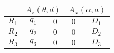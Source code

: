 \begin{tabular}{c|c|c|c|c|}
            \cline{2-5} &
            \multicolumn{2}{|c|}{$A_z(\theta,d)$} &
            \multicolumn{2}{|c|}{$A_x(\alpha,a)$} \\
            \hline
        \multicolumn{1}{|c|}{$R_1$} & $q_{1}$ & $0$ & $0$ & $D_{1}$ \\
            \hline
        \multicolumn{1}{|c|}{$R_2$} & $q_{2}$ & $0$ & $0$ & $D_{2}$ \\
            \hline
        \multicolumn{1}{|c|}{$R_3$} & $q_{3}$ & $0$ & $0$ & $D_{3}$ \\
            \hline
\end{tabular}
